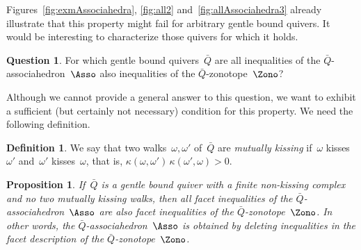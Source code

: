 \documentclass{amsart}
\newtheorem{proposition}[theorem]{Proposition}
\theoremstyle{definition}
\newtheorem{definition}[theorem]{Definition}
\newtheorem{question}[theorem]{Question}
\newcommand{\darkblue}{\color{darkblue}} %
\newcommand{\defn}[1]{\textsl{\darkblue #1}} %
\newcommand{\kn}{\kappa} %
\begin{document}
Figures~\ref{fig:exmAssociahedra}, \ref{fig:all2} and~\ref{fig:allAssociahedra3} already illustrate that this property might fail for arbitrary gentle bound quivers.
It would be interesting to characterize those quivers for which it holds.

\begin{question}
For which gentle bound quivers~$\bar Q$ are all inequalities of the $\bar Q$-associahedron~$\Asso$ also inequalities of the $\bar Q$-zonotope~$\Zono$?
\end{question}

Although we cannot provide a general answer to this question, we want to exhibit a sufficient (but certainly not necessary) condition for this property.
We need the following definition.

\begin{definition}
We say that two walks~$\omega, \omega'$ of~$\bar Q$ are \defn{mutually kissing} if~$\omega$ kisses~$\omega'$ and~$\omega'$ kisses~$\omega$, that is, $\kn(\omega,\omega') \, \kn(\omega',\omega) > 0$.
\end{definition}

\begin{proposition}
\label{prop:zonotope}
If~$\bar Q$ is a gentle bound quiver with a finite non-kissing complex and no two mutually kissing walks, then all facet inequalities of the $\bar Q$-associahedron~$\Asso$ are also facet inequalities of the $\bar Q$-zonotope~$\Zono$.
In other words, the $\bar Q$-associahedron~$\Asso$ is obtained by deleting inequalities in the facet description of the $\bar Q$-zonotope~$\Zono$.
\end{proposition}
\end{document}
